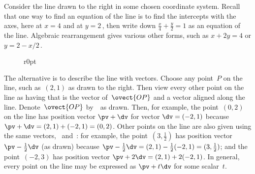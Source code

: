 \begin{example} 
Consider the line drawn to the right in some chosen coordinate system.
Recall that one way to find an equation of the line is to find the intercepts with the axes, here at \(x=4\) and at \(y=2\)\,, then write down \(\frac x4+\frac y2=1\) as an equation of the line.
Algebraic rearrangement gives various other forms, such as \(x+2y=4\) or \(y=2-x/2\)\,.

\begin{wrapfigure}r{0pt}
\end{wrapfigure}%
The alternative is to describe the line with vectors.
Choose any point~\(P\) on the line, such as~\((2,1)\) as drawn to the right.
Then view every other point on the line as having  that is the vector  of~\(\ovect{OP}\) and a vector aligned along the line.
Denote~\(\ovect{OP}\) by~\pv\ as drawn.
Then, for example, the point~\((0,2)\) on the line has position vector  \(\pv+\dv\) for vector \(\dv=(-2,1)\) because \(\pv+\dv=(2,1)+(-2,1)=(0,2)\).
Other points on the line are also given using the same vectors, \pv\ and~\dv: for example, the point~\((3,\tfrac12)\) has position vector \(\pv-\tfrac12\dv\) (as drawn) because \(\pv-\tfrac12\dv=(2,1)-\tfrac12(-2,1)=(3,\tfrac12)\); and the point~\((-2,3)\) has position vector \(\pv+2\dv=(2,1)+2(-2,1)\).
In general, every point on the line may be expressed as \(\pv+t\dv\) for some scalar~\(t\).


\end{example}

